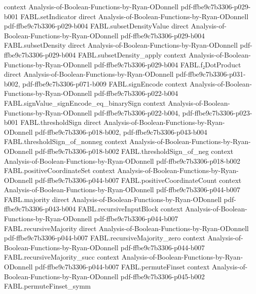 \begin{theorem}
  {context}
  {Analysis-of-Boolean-Functions-by-Ryan-ODonnell}
  {pdf-ffbe9c7b3306-p029-b001}
\proofstep
  {FABL.setIndicator}
  {direct}
  {Analysis-of-Boolean-Functions-by-Ryan-ODonnell}
  {pdf-ffbe9c7b3306-p029-b004}
\proofstep
  {FABL.subsetDensityValue}
  {direct}
  {Analysis-of-Boolean-Functions-by-Ryan-ODonnell}
  {pdf-ffbe9c7b3306-p029-b004}
\proofstep
  {FABL.subsetDensity}
  {direct}
  {Analysis-of-Boolean-Functions-by-Ryan-ODonnell}
  {pdf-ffbe9c7b3306-p029-b004}
\proofstep
  {FABL.subsetDensity_apply}
  {context}
  {Analysis-of-Boolean-Functions-by-Ryan-ODonnell}
  {pdf-ffbe9c7b3306-p029-b004}
\proofstep
  {FABL.f₂DotProduct}
  {direct}
  {Analysis-of-Boolean-Functions-by-Ryan-ODonnell}
  {pdf-ffbe9c7b3306-p031-b002,
    pdf-ffbe9c7b3306-p071-b009}
\proofstep
  {FABL.signEncode}
  {context}
  {Analysis-of-Boolean-Functions-by-Ryan-ODonnell}
  {pdf-ffbe9c7b3306-p022-b004}
\proofstep
  {FABL.signValue_signEncode_eq_binarySign}
  {context}
  {Analysis-of-Boolean-Functions-by-Ryan-ODonnell}
  {pdf-ffbe9c7b3306-p022-b004,
    pdf-ffbe9c7b3306-p023-b001}
\proofstep
  {FABL.thresholdSign}
  {direct}
  {Analysis-of-Boolean-Functions-by-Ryan-ODonnell}
  {pdf-ffbe9c7b3306-p018-b002,
    pdf-ffbe9c7b3306-p043-b004}
\proofstep
  {FABL.thresholdSign_of_nonneg}
  {context}
  {Analysis-of-Boolean-Functions-by-Ryan-ODonnell}
  {pdf-ffbe9c7b3306-p018-b002}
\proofstep
  {FABL.thresholdSign_of_neg}
  {context}
  {Analysis-of-Boolean-Functions-by-Ryan-ODonnell}
  {pdf-ffbe9c7b3306-p018-b002}
\proofstep
  {FABL.positiveCoordinateSet}
  {context}
  {Analysis-of-Boolean-Functions-by-Ryan-ODonnell}
  {pdf-ffbe9c7b3306-p044-b007}
\proofstep
  {FABL.positiveCoordinateCount}
  {context}
  {Analysis-of-Boolean-Functions-by-Ryan-ODonnell}
  {pdf-ffbe9c7b3306-p044-b007}
\proofstep
  {FABL.majority}
  {direct}
  {Analysis-of-Boolean-Functions-by-Ryan-ODonnell}
  {pdf-ffbe9c7b3306-p043-b004}
\proofstep
  {FABL.recursiveInputBlock}
  {context}
  {Analysis-of-Boolean-Functions-by-Ryan-ODonnell}
  {pdf-ffbe9c7b3306-p044-b007}
\proofstep
  {FABL.recursiveMajority}
  {direct}
  {Analysis-of-Boolean-Functions-by-Ryan-ODonnell}
  {pdf-ffbe9c7b3306-p044-b007}
\proofstep
  {FABL.recursiveMajority_zero}
  {context}
  {Analysis-of-Boolean-Functions-by-Ryan-ODonnell}
  {pdf-ffbe9c7b3306-p044-b007}
\proofstep
  {FABL.recursiveMajority_succ}
  {context}
  {Analysis-of-Boolean-Functions-by-Ryan-ODonnell}
  {pdf-ffbe9c7b3306-p044-b007}
\proofstep
  {FABL.permuteFinset}
  {context}
  {Analysis-of-Boolean-Functions-by-Ryan-ODonnell}
  {pdf-ffbe9c7b3306-p045-b002}
\proofstep
  {FABL.permuteFinset_symm}

\end{theorem}

